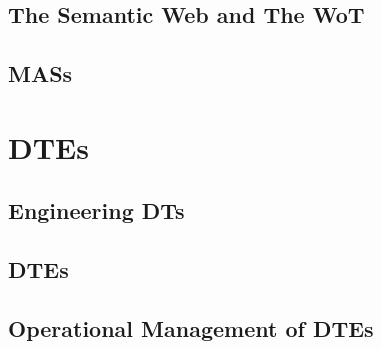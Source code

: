 \documentclass[12pt,a4paper,openright,twoside]{book}
\begin{document}


\chapter{The Semantic Web and The \acl{WoT}}
\label{chap:back:Web}




\chapter{\aclp{MAS}}
\label{chap:back:MAS}



\part{\aclp{DTE}}
\label{part:dte}

\chapter{Engineering \aclp{DT}}
\label{chap:dte:engineering-dt}



\chapter{\aclp{DTE}}
\label{chap:dte:dte}



\chapter{Operational Management of \aclp{DTE}}
\label{chap:dte:dtc}
\end{document}
